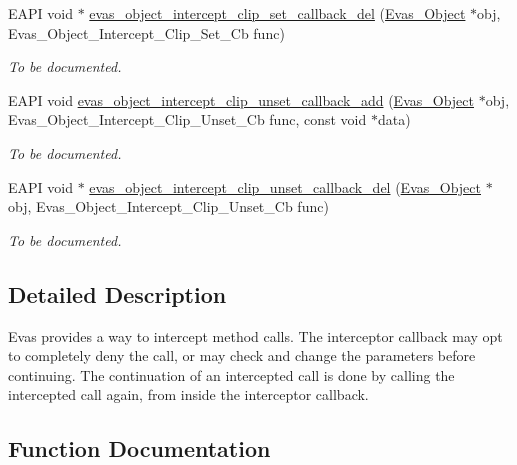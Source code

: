 \begin{DoxyCompactItemize}
EAPI void $\ast$ \hyperlink{group__Evas__Object__Group__Interceptors_gab36329c91b46748f30c1bffb811f70ce}{evas\_\-object\_\-intercept\_\-clip\_\-set\_\-callback\_\-del} (\hyperlink{group__Evas__Object__Group_ga9e19e6dd1f517a0ba437c0114d3e7c97}{Evas\_\-Object} $\ast$obj, Evas\_\-Object\_\-Intercept\_\-Clip\_\-Set\_\-Cb func)
\begin{DoxyCompactList}\small\item\em To be documented. \item\end{DoxyCompactList}\item 
EAPI void \hyperlink{group__Evas__Object__Group__Interceptors_ga608008f35ffb143afc70c7154530a2c5}{evas\_\-object\_\-intercept\_\-clip\_\-unset\_\-callback\_\-add} (\hyperlink{group__Evas__Object__Group_ga9e19e6dd1f517a0ba437c0114d3e7c97}{Evas\_\-Object} $\ast$obj, Evas\_\-Object\_\-Intercept\_\-Clip\_\-Unset\_\-Cb func, const void $\ast$data)
\begin{DoxyCompactList}\small\item\em To be documented. \item\end{DoxyCompactList}\item 
EAPI void $\ast$ \hyperlink{group__Evas__Object__Group__Interceptors_gaa4985b2b46b9f0f3126856a343136286}{evas\_\-object\_\-intercept\_\-clip\_\-unset\_\-callback\_\-del} (\hyperlink{group__Evas__Object__Group_ga9e19e6dd1f517a0ba437c0114d3e7c97}{Evas\_\-Object} $\ast$obj, Evas\_\-Object\_\-Intercept\_\-Clip\_\-Unset\_\-Cb func)
\begin{DoxyCompactList}\small\item\em To be documented. \item\end{DoxyCompactList}\end{DoxyCompactItemize}


\subsection{Detailed Description}
Evas provides a way to intercept method calls. The interceptor callback may opt to completely deny the call, or may check and change the parameters before continuing. The continuation of an intercepted call is done by calling the intercepted call again, from inside the interceptor callback. 

\subsection{Function Documentation}
